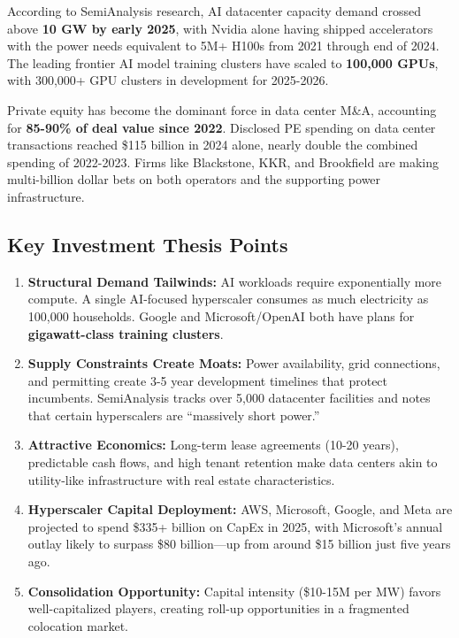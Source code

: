 \documentclass[11pt,a4paper]{article}
\begin{document}
According to SemiAnalysis research, AI datacenter capacity demand crossed above \textbf{10 GW by early 2025}, with Nvidia alone having shipped accelerators with the power needs equivalent to 5M+ H100s from 2021 through end of 2024. The leading frontier AI model training clusters have scaled to \textbf{100,000 GPUs}, with 300,000+ GPU clusters in development for 2025-2026.

Private equity has become the dominant force in data center M\&A, accounting for \textbf{85-90\% of deal value since 2022}. Disclosed PE spending on data center transactions reached \$115 billion in 2024 alone, nearly double the combined spending of 2022-2023. Firms like Blackstone, KKR, and Brookfield are making multi-billion dollar bets on both operators and the supporting power infrastructure.

\subsection{Key Investment Thesis Points}

\begin{enumerate}[leftmargin=*, itemsep=6pt]
    \item \textbf{Structural Demand Tailwinds:} AI workloads require exponentially more compute. A single AI-focused hyperscaler consumes as much electricity as 100,000 households. Google and Microsoft/OpenAI both have plans for \textbf{gigawatt-class training clusters}.
    
    \item \textbf{Supply Constraints Create Moats:} Power availability, grid connections, and permitting create 3-5 year development timelines that protect incumbents. SemiAnalysis tracks over 5,000 datacenter facilities and notes that certain hyperscalers are ``massively short power.''
    
    \item \textbf{Attractive Economics:} Long-term lease agreements (10-20 years), predictable cash flows, and high tenant retention make data centers akin to utility-like infrastructure with real estate characteristics.
    
    \item \textbf{Hyperscaler Capital Deployment:} AWS, Microsoft, Google, and Meta are projected to spend \$335+ billion on CapEx in 2025, with Microsoft's annual outlay likely to surpass \$80 billion—up from around \$15 billion just five years ago.
    
    \item \textbf{Consolidation Opportunity:} Capital intensity (\$10-15M per MW) favors well-capitalized players, creating roll-up opportunities in a fragmented colocation market.
\end{enumerate}
\end{document}
